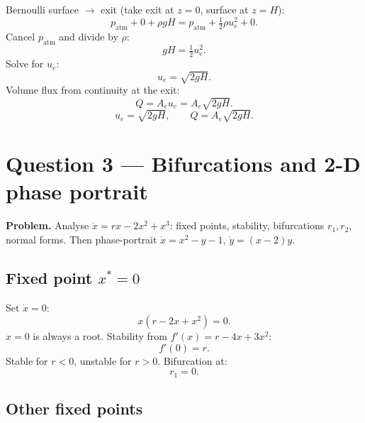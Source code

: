 \documentclass[11pt]{article}
\begin{document}
Bernoulli surface $\to$ exit (take exit at $z=0$, surface at $z=H$):
\[ p_\text{atm}+0+\rho g H=p_\text{atm}+\tfrac{1}{2}\rho u_e^{2}+0. \]
Cancel $p_\text{atm}$ and divide by $\rho$:
\[ gH=\tfrac{1}{2}u_e^{2}. \]
Solve for $u_e$:
\[ u_e=\sqrt{2gH}. \]
Volume flux from continuity at the exit:
\[ Q=A_e u_e=A_e\sqrt{2gH}. \]
\[ \boxed{\;u_e=\sqrt{2gH},\qquad Q=A_e\sqrt{2gH}.\;} \]

\begin{center}
\end{center}

\section*{Question 3 --- Bifurcations and 2-D phase portrait}

\textbf{Problem.} Analyse $\dot x=rx-2x^{2}+x^{3}$: fixed points, stability, bifurcations $r_1,r_2$, normal forms. Then phase-portrait $\dot x=x^{2}-y-1$, $\dot y=(x-2)y$.

\subsection*{Fixed point $x^{*}=0$}

Set $\dot x=0$:
\[ x(r-2x+x^{2})=0. \]
$x=0$ is always a root. Stability from $f'(x)=r-4x+3x^{2}$:
\[ f'(0)=r. \]
Stable for $r<0$, unstable for $r>0$. Bifurcation at:
\[ \boxed{\;r_{1}=0.\;} \]

\subsection*{Other fixed points}
\end{document}
